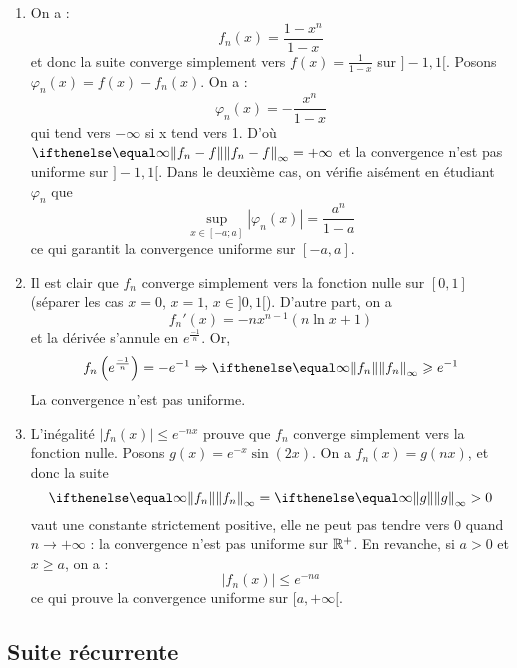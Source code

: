 \begin{enumerate}
    \item On a :
        \[
            f_n(x)=\frac{1-x^n}{1-x}
        \]
        et donc la suite converge simplement vers $f(x)=\frac{1}{1-x}$ sur $]-1,1[$. Posons $\varphi_n(x)=f(x)-f_n(x)$. On a :
        \[
            \varphi_n(x)=-\frac{x^n}{1-x}
        \]
        qui tend vers $-\infty$ si x tend vers 1. D'où $\norme{f_n-f}{\infty}=+\infty$ et la convergence n'est pas uniforme sur $]-1,1[$. Dans le deuxième cas, on vérifie aisément en étudiant $\varphi_n$ que 
        \[
            \sup_{x\in[-a;a]}|\varphi_n(x)|=\frac{a^n}{1-a}
        \]
ce qui garantit la convergence uniforme sur $[-a,a]$.
    \item Il est clair que $f_n$ converge simplement vers la fonction nulle sur $[0,1]$ (séparer les cas $x=0$, $x=1$, $x\in]0,1[$). D'autre part, on a
        \[
            f_n'(x)=-nx^{n-1}(n\ln x+1)
        \]
        et la dérivée s'annule en $e^{\frac{-1}{n}}$. Or,
        \[
            f_n\left(e^{\frac{-1}{n}}\right)=-e^{-1} \Ra \norme{f_n}{\infty} \geqslant e^{-1}
        \]
        La convergence n'est pas uniforme.
    \item L'inégalité $|f_n(x)|\leqslant e^{-nx}$ prouve que $f_n$ converge simplement vers la fonction nulle. Posons $g(x)=e^{-x}\sin(2x)$. On a $f_n(x)=g(nx)$, et donc la suite 
        \[
            \norme{f_n}{\infty}=\norme{g}{\infty}>0
        \]
        vaut une constante strictement positive, elle ne peut pas tendre vers 0 quand $n\to+\infty$ : la convergence n'est pas uniforme sur $\mathbb{R}^+$. En revanche, si $a>0$ et $x\geqslant a$, on a :
        \[
            |f_n(x)|\leqslant e^{-na}
        \]
        ce qui prouve la convergence uniforme sur $[a,+\infty[$.
\end{enumerate}

\subsection{Suite récurrente}

